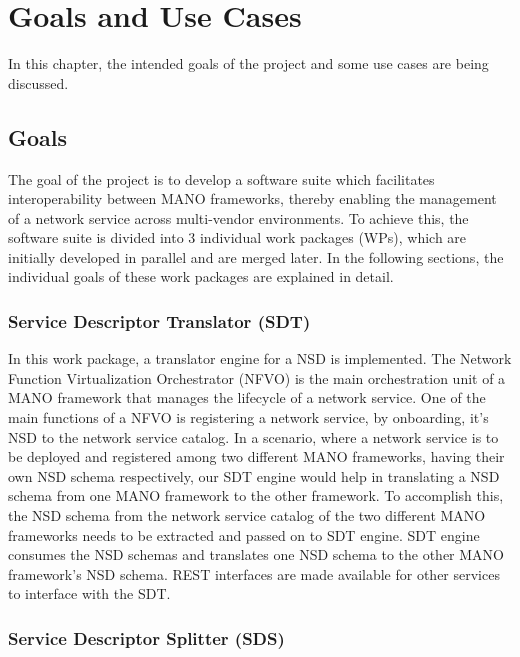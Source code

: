 \chapter{Goals and Use Cases}
\label{ch:Goals and Use Cases}

In this chapter, the intended goals of the project and some use cases are being discussed.

\section{Goals}

The goal of the project is to develop a software suite which facilitates interoperability between MANO frameworks, thereby enabling the management of a network service across multi-vendor environments. To achieve this, the software suite is divided into 3 individual work packages (WPs), which are initially developed in parallel and are merged later. In the following sections, the individual goals of these work packages are explained in detail.

\subsection{Service Descriptor Translator (SDT)}

In this work package, a translator engine for a NSD is implemented. The Network Function Virtualization Orchestrator (NFVO) is the main orchestration unit of a MANO framework that manages the lifecycle of a network service. One of the main functions of a NFVO is registering a network service, by onboarding, it's NSD to the network service catalog. In a scenario, where a network service is to be deployed and registered among two different MANO
frameworks, having their own NSD schema respectively, our SDT engine would help in translating a NSD schema from one MANO framework to the other framework. To accomplish this, the NSD schema from the network service catalog of the two different MANO frameworks needs to be extracted and passed on to SDT engine. SDT engine consumes the NSD schemas and translates one NSD schema to the other MANO framework's NSD schema. REST interfaces are made available for other services to interface with the SDT.

\subsection{Service Descriptor Splitter (SDS)}

